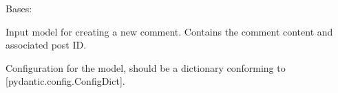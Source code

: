 \documentclass[letterpaper,10pt,openany,oneside,english]{sphinxmanual}
\begin{document}
\begin{savenotes}\begin{fulllineitems}

\pysigstartsignatures
{}
\pysigstopsignatures
\sphinxAtStartPar
Bases: 

\sphinxAtStartPar
Input model for creating a new comment.
Contains the comment content and associated post ID.


\begin{savenotes}\begin{fulllineitems}

\pysigstartsignatures
{}
\pysigstopsignatures
\end{fulllineitems}\end{savenotes}



\begin{savenotes}\begin{fulllineitems}

\pysigstartsignatures
{}
\pysigstopsignatures
\sphinxAtStartPar
Configuration for the model, should be a dictionary conforming to {[}\sphinxtitleref{ConfigDict}{]}{[}pydantic.config.ConfigDict{]}.

\end{fulllineitems}\end{savenotes}



\begin{savenotes}\begin{fulllineitems}

\pysigstartsignatures
{}
\pysigstopsignatures
\end{fulllineitems}\end{savenotes}


\end{fulllineitems}\end{savenotes}
\end{document}
